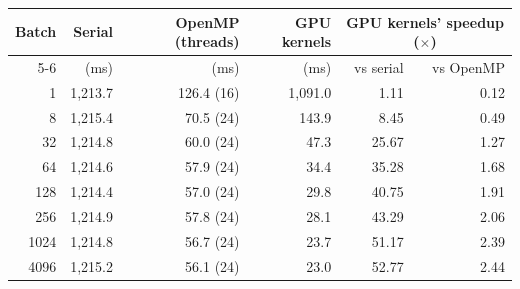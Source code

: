 \begin{tabular}{rrrrrr}
\toprule
Batch & Serial & OpenMP (threads) & GPU kernels & \multicolumn{2}{c}{GPU kernels' speedup ($\times$)} \\
\cmidrule(lr){5-6}
 & (ms) & (ms) & (ms) & vs serial & vs OpenMP \\
\midrule
1 & 1{,}213.7 & 126.4 (16) & 1{,}091.0 & 1.11 & 0.12 \\
8 & 1{,}215.4 & 70.5 (24) & 143.9 & 8.45 & 0.49 \\
32 & 1{,}214.8 & 60.0 (24) & 47.3 & 25.67 & 1.27 \\
64 & 1{,}214.6 & 57.9 (24) & 34.4 & 35.28 & 1.68 \\
128 & 1{,}214.4 & 57.0 (24) & 29.8 & 40.75 & 1.91 \\
256 & 1{,}214.9 & 57.8 (24) & 28.1 & 43.29 & 2.06 \\
1024 & 1{,}214.8 & 56.7 (24) & 23.7 & 51.17 & 2.39 \\
4096 & 1{,}215.2 & 56.1 (24) & 23.0 & 52.77 & 2.44 \\
\bottomrule
\end{tabular}
